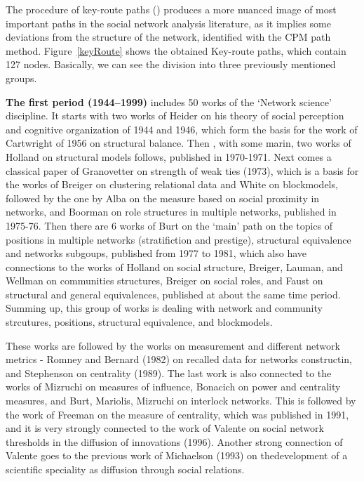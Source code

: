 \documentclass[11pt]{article} %
\begin{document}
The procedure of key-route paths () produces a more nuanced image of most important paths in the social network analysis literature, as it  implies some deviations from the structure of the network, identified with the CPM path method.  Figure~\ref{keyRoute} shows the obtained Key-route paths, which contain 127 nodes. Basically, we can see the division into three previously mentioned groups. \medskip   

\textbf{The first period (1944--1999)} includes 50 works of the `Network science' discipline. It starts with two works of Heider on his theory of social perception and cognitive organization of 1944 and 1946, which form the basis for the work of Cartwright of 1956 on structural balance. Then , with some marin, two works of Holland on structural models follows, published in 1970-1971. Next comes a classical paper of Granovetter on strength of weak ties (1973), which is a basis for the works of Breiger on clustering relational data and White on blockmodels, followed by the one by Alba on the measure based on social proximity in networks, and Boorman on role structures in multiple networks, published in 1975-76. Then there are 6 works of Burt on the `main' path on the topics of positions in multiple networks (stratifiction and prestige), structural equivalence and networks subgoups, published from 1977 to 1981, which also have connections to  the works of Holland on social structure, Breiger, Lauman, and Wellman on communities structures, Breiger on social roles, and Faust on structural and general equivalences, published at about the same time period. Summing up, this group of works is dealing with network and community strcutures, positions, structural equivalence, and blockmodels.  \medskip 

These works are followed by the works on measurement and different network metrics - Romney and Bernard (1982) on recalled data for networks constructin, and Stephenson on centrality (1989). The last work is also connected to the works of Mizruchi on measures of influence, Bonacich on power and centrality measures, and Burt, Mariolis, Mizruchi on interlock networks. This is followed by the work of Freeman on the measure of centrality, which was published in 1991, and it is very strongly connected to the work of Valente on social network thresholds in the diffusion of innovations (1996). Another strong connection of Valente goes to the previous work of Michaelson (1993) on thedevelopment of a scientific speciality as diffusion through social relations.  \medskip 
\end{document}

